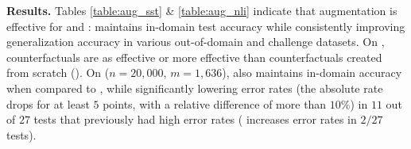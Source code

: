 


\textbf{Results.}
Tables \ref{table:aug_sst} \& \ref{table:aug_nli} indicate that \sysname augmentation is effective for \sst and \nli: \maug maintains in-domain test accuracy while consistently improving generalization accuracy in various out-of-domain and challenge datasets. 
On \nli, \sysname counterfactuals are as effective or more effective than counterfactuals created from scratch (\mcad).
On \qqp ($n{=}20,000$, $m{=}1,636$), \maug also maintains in-domain accuracy when compared to \mcomp, while significantly lowering error rates (the absolute rate drops for at least $5$ points, with a relative difference of more than $10\%$) in $11$ out of $27$ tests that previously had high error rates (\sysname{} increases error rates in $2/27$ tests).

